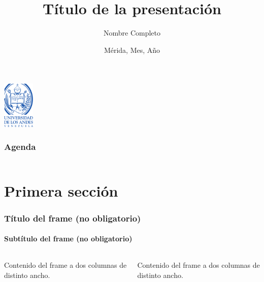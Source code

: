\documentclass[spanish,xcolor=dvipsnames]{beamer}
\title{Título de la presentación}
\author[Nombre Corto]{Nombre Completo}
\institute[ULA]{
        Facultad de Nombre\\
        Departamento o Escuela
    }
\date[Mes Año]{\footnotesize Mérida, Mes, Año}
\begin{document}
    \begin{frame}[plain] %
	    \begin{center}
	    	\includegraphics[width=1.5cm]{ULA_logo_titulo}
	    \end{center}
	    \titlepage
    \end{frame}
	
    
    \begin{frame}\justifying
        \frametitle{Agenda}
        \begin{columns}
            \begin{column}{0.0cm}
            \end{column}
            \begin{column}{0.9\textwidth}
                \tableofcontents
            \end{column}
        \end{columns}
    \end{frame}

    \section{Primera sección}
    \begin{frame}
        \frametitle{Título del frame (no obligatorio)}
        \framesubtitle{Subtítulo del frame (no obligatorio)}
        \begin{columns}
        	\begin{column}{.7\linewidth}
        		Contenido del frame a dos columnas de distinto ancho.
        	\end{column}
        	\begin{column}{.3\linewidth}
        		Contenido del frame a dos columnas de distinto ancho.
        	\end{column}
        \end{columns}
    \end{frame}
\end{document}
